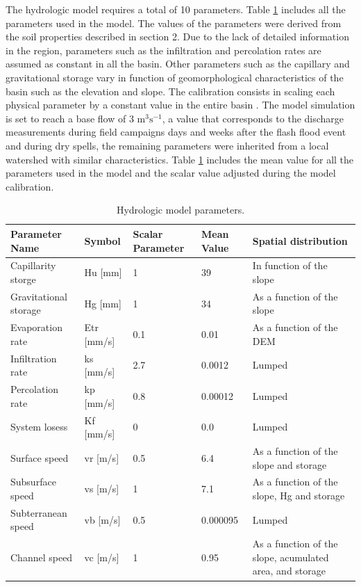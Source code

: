 \documentclass[hess, manuscript]{copernicus}
\begin{document}
The hydrologic model requires a total of 10 parameters. Table \ref{tab:parameters} includes all the parameters used in the model.  The values of the parameters were derived from the soil properties described in section 2. Due to the lack of detailed information in the region, parameters such as the infiltration and percolation rates are assumed as constant in all the basin.  Other parameters such as the capillary and gravitational storage vary in function of geomorphological characteristics of the basin such as the elevation and slope. The calibration consists in scaling each physical parameter by a constant value in the entire basin \citep{Frances2007d}. The model simulation is set to reach a base flow of 3 m$^3 \text{s}^{-1}$, a value that corresponds to the discharge measurements during field campaigns days and weeks after the flash flood event and during dry spells, the remaining parameters were inherited from a local watershed with similar characteristics.  Table \ref{tab:parameters} includes the mean value for all the parameters used in the model and the scalar value adjusted during the model calibration.

\begin{table}[]
        \centering
        \begin{tabularx}{\textwidth}{p{3cm} p{2.2cm} p{1.5cm} p{2cm} p{3.5cm}}
\hline
Parameter Name & Symbol & Scalar Parameter & Mean Value & Spatial distribution \\
\hline
Capillarity storge & Hu [mm] & 1 & 39 & In function of the slope \\
Gravitational storage & Hg [mm] & 1 & 34 & As a function of the slope \\
Evaporation rate & Etr [mm/s] & 0.1 & 0.01 & As a function of the DEM \\
Infiltration rate & ks [mm/s] & 2.7 & 0.0012 & Lumped \\
Percolation rate & kp [mm/s] & 0.8 & 0.00012 & Lumped \\
System losess & Kf [mm/s] & 0 & 0.0 & Lumped \\
Surface speed & vr [m/s] & 0.5 & 6.4 & As a function of the slope and storage \\
Subsurface speed & vs [m/s] & 1 & 7.1 & As a function of the slope, Hg and storage\\
Subterranean speed & vb [m/s] & 0.5 & 0.000095 & Lumped \\
Channel speed & vc [m/s] & 1 & 0.95 & As a function of the slope, acumulated area, and storage \\
\hline
\end{tabularx}
        \caption{Hydrologic model parameters.}
        \label{tab:parameters}
    \end{table}
\end{document}
